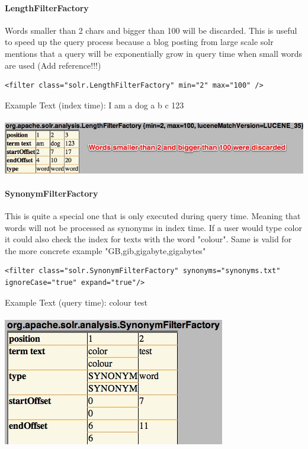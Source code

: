 \paragraph{LengthFilterFactory} Words smaller than 2 chars and bigger than 100 will be discarded. This is useful to speed up the query process because a blog posting from large scale solr mentions that a query will be exponentially grow in query time when small  words are used (Add reference!!!)
\begin{verbatim}
<filter class="solr.LengthFilterFactory" min="2" max="100" />
\end{verbatim}
Example Text (index time): I am a dog a b c 123
\mbox{} \\
\mbox{} \\
\includegraphics[width=\textwidth]{images/lengthfilterfactory.jpg}

\paragraph{SynonymFilterFactory} This is quite a special one that is only executed during query time. Meaning that words will not be processed as synonyms in index time. If a user would type color it could also check the index for texts with the word "colour". Same is valid for the more concrete example "GB,gib,gigabyte,gigabytes"
\begin{verbatim}
<filter class="solr.SynonymFilterFactory" synonyms="synonyms.txt" ignoreCase="true" expand="true"/>
\end{verbatim}
Example Text (query time): colour test
\mbox{} \\
\mbox{} \\
\includegraphics[width=\textwidth/2]{images/synonymfilterfactory.jpg}

